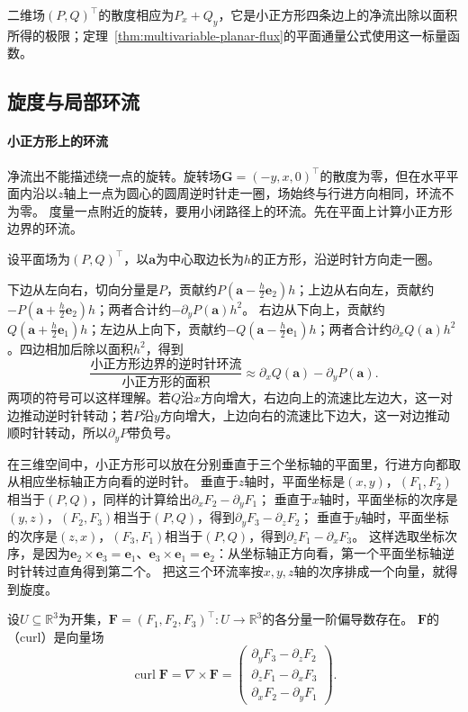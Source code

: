 二维场$(P,Q)^\top$的散度相应为$P_x+Q_y$，它是小正方形四条边上的净流出除以面积所得的极限；定理~\ref{thm:multivariable-planar-flux}的平面通量公式使用这一标量函数。

\subsection{旋度与局部环流}

\paragraph{小正方形上的环流}

净流出不能描述绕一点的旋转。旋转场$\bm G=(-y,x,0)^\top$的散度为零，但在水平平面内沿以$z$轴上一点为圆心的圆周逆时针走一圈，场始终与行进方向相同，环流不为零。
度量一点附近的旋转，要用小闭路径上的环流。先在平面上计算小正方形边界的环流。

设平面场为$(P,Q)^\top$，以$\bm a$为中心取边长为$h$的正方形，沿逆时针方向走一圈。

下边从左向右，切向分量是$P$，贡献约$P(\bm a-\tfrac h2\bm e_2)h$；上边从右向左，贡献约$-P(\bm a+\tfrac h2\bm e_2)h$；两者合计约$-\partial_yP(\bm a)h^2$。
右边从下向上，贡献约$Q(\bm a+\tfrac h2\bm e_1)h$；左边从上向下，贡献约$-Q(\bm a-\tfrac h2\bm e_1)h$；两者合计约$\partial_xQ(\bm a)h^2$。四边相加后除以面积$h^2$，得到
\[
 \frac{\text{小正方形边界的逆时针环流}}{\text{小正方形的面积}}
 \approx\partial_xQ(\bm a)-\partial_yP(\bm a).
\]
两项的符号可以这样理解。若$Q$沿$x$方向增大，右边向上的流速比左边大，这一对边推动逆时针转动；若$P$沿$y$方向增大，上边向右的流速比下边大，这一对边推动顺时针转动，所以$\partial_yP$带负号。

在三维空间中，小正方形可以放在分别垂直于三个坐标轴的平面里，行进方向都取从相应坐标轴正方向看的逆时针。
垂直于$z$轴时，平面坐标是$(x,y)$，$(F_1,F_2)$相当于$(P,Q)$，同样的计算给出$\partial_xF_2-\partial_yF_1$；
垂直于$x$轴时，平面坐标的次序是$(y,z)$，$(F_2,F_3)$相当于$(P,Q)$，得到$\partial_yF_3-\partial_zF_2$；
垂直于$y$轴时，平面坐标的次序是$(z,x)$，$(F_3,F_1)$相当于$(P,Q)$，得到$\partial_zF_1-\partial_xF_3$。
这样选取坐标次序，是因为$\bm e_2\times\bm e_3=\bm e_1$、$\bm e_3\times\bm e_1=\bm e_2$：从坐标轴正方向看，第一个平面坐标轴逆时针转过直角得到第二个。
把这三个环流率按$x,y,z$轴的次序排成一个向量，就得到旋度。
\begin{definition}[旋度]
\label{def:multivariable-curl}
设$U\subseteq\mathbb R^3$为开集，$\bm F=(F_1,F_2,F_3)^\top:U\to\mathbb R^3$的各分量一阶偏导数存在。
$\bm F$的（curl）是向量场
\[
 \operatorname{curl}\bm F=\nabla\times\bm F
 =\begin{pmatrix}
   \partial_yF_3-\partial_zF_2\\
   \partial_zF_1-\partial_xF_3\\
   \partial_xF_2-\partial_yF_1
  \end{pmatrix}.
\]
\end{definition}

